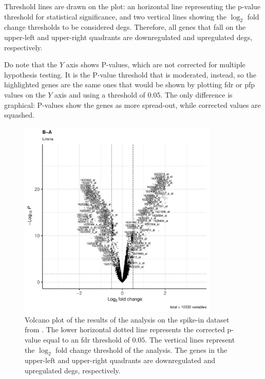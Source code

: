 Threshold lines are drawn on the plot: an horizontal line representing the p-value threshold for statistical significance, and two vertical lines showing the $\log_2$ fold change thresholds to be considered \glspl{deg}. Therefore, all genes that fall on the upper-left and upper-right quadrants are downregulated and upregulated \glspl{deg}, respectively.

Do note that the $Y$ axis shows P-values, which are not corrected for multiple hypothesis testing. It is the P-value threshold that is moderated, instead, so the highlighted genes are the same ones that would be shown by plotting \gls{fdr} or \gls{pfp} values on the $Y$ axis and using a threshold of $0.05$. The only difference is graphical: P-values show the genes as more spread-out, while corrected values are squashed.

\begin{figure}
    \centering
    \includegraphics[width=0.85\textwidth]{resources/images/15_Volcano with Limma DEGs B-A.pdf}
    \caption{Volcano plot of the results of the  analysis on the spike-in dataset from \textcite{zhuPreferredAnalysisMethods2010}. The lower horizontal dotted line represents the corrected p-value equal to an \gls{fdr} threshold of $0.05$. The vertical lines represent the $\log_2$ fold change threshold of the analysis. The genes in the upper-left and upper-right quadrants are downregulated and upregulated \glspl{deg}, respectively.}
    \label{fig:volcanolimma}
\end{figure}


